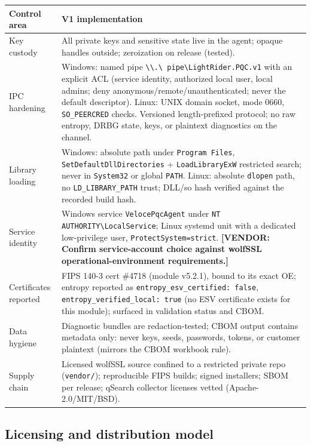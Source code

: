 \documentclass[10pt]{article}
\newcommand{\dep}[1]{\textcolor{warnred}{\sffamily\bfseries\small [VENDOR: #1]}}
\newcommand{\code}[1]{\texttt{\small #1}}
\begin{document}
\begin{small}
\begin{tabularx}{\textwidth}{@{}lL@{}}
\toprule
\textbf{Control area} & \textbf{V1 implementation} \\
\midrule
Key custody & All private keys and sensitive state live in the agent; opaque handles
  outside; zeroization on release (tested). \\
IPC hardening & Windows: named pipe \code{\textbackslash\textbackslash.\textbackslash
  pipe\textbackslash LightRider.PQC.v1} with an explicit ACL (service identity, authorized
  local user, local admins; deny anonymous/remote/unauthenticated; never the default
  descriptor). Linux: UNIX domain socket, mode 0660, \code{SO\_PEERCRED} checks.
  Versioned length-prefixed protocol; no raw entropy, DRBG state, keys, or plaintext
  diagnostics on the channel. \\
Library loading & Windows: absolute path under \code{Program Files},
  \code{SetDefaultDllDirectories} + \code{LoadLibraryExW} restricted search; never in
  \code{System32} or global \code{PATH}. Linux: absolute \code{dlopen} path, no
  \code{LD\_LIBRARY\_PATH} trust; DLL/so hash verified against the recorded build hash. \\
Service identity & Windows service \code{VelocePqcAgent} under
  \code{NT AUTHORITY\textbackslash LocalService}; Linux systemd unit with a dedicated
  low-privilege user, \code{ProtectSystem=strict}. \dep{Confirm service-account choice
  against wolfSSL operational-environment requirements.} \\
Certificates reported & FIPS 140-3 cert \#4718 (module v5.2.1), bound to its exact OE;
  entropy reported as \code{entropy\_esv\_certified:\ false},
  \code{entropy\_verified\_local:\ true} (no ESV certificate exists for this module);
  surfaced in validation status and CBOM. \\
Data hygiene & Diagnostic bundles are redaction-tested; CBOM output contains metadata
  only: never keys, seeds, passwords, tokens, or customer plaintext (mirrors the CBOM
  workbook rule). \\
Supply chain & Licensed wolfSSL source confined to a restricted private repo
  (\code{vendor/}); reproducible FIPS builds; signed installers; SBOM per release;
  qSearch collector licenses vetted (Apache-2.0/MIT/BSD). \\
\bottomrule
\end{tabularx}
\end{small}

\subsection{Licensing and distribution model}\label{sec:license}
\end{document}
